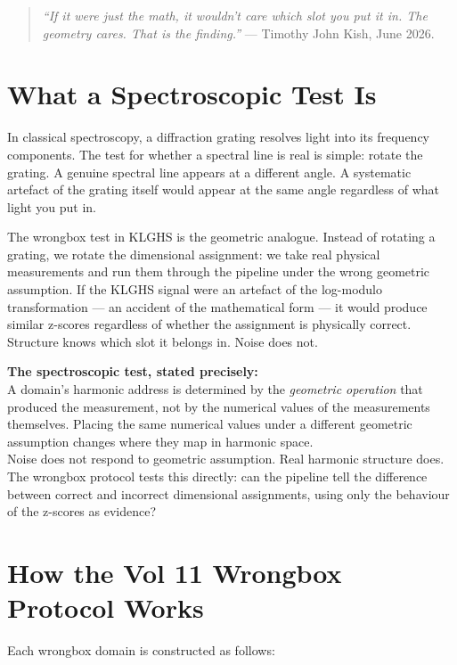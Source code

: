 \documentclass[11pt, letterpaper, openany]{book}
\begin{document}
\begin{quote}
\textit{``If it were just the math, it wouldn't care which slot you put it in.
The geometry cares. That is the finding.''} --- Timothy John Kish, June 2026.
\end{quote}

\section{What a Spectroscopic Test Is}

In classical spectroscopy, a diffraction grating resolves light into its
frequency components. The test for whether a spectral line is real is simple:
rotate the grating. A genuine spectral line appears at a different angle.
A systematic artefact of the grating itself would appear at the same angle
regardless of what light you put in.

The wrongbox test in KLGHS is the geometric analogue. Instead of rotating
a grating, we rotate the dimensional assignment: we take real physical
measurements and run them through the pipeline under the wrong geometric
assumption. If the KLGHS signal were an artefact of the log-modulo
transformation --- an accident of the mathematical form --- it would produce
similar z-scores regardless of whether the assignment is physically correct.
Structure knows which slot it belongs in. Noise does not.

\begin{spectrobox}
\textbf{The spectroscopic test, stated precisely:}\\[0.5em]
A domain's harmonic address is determined by the \textit{geometric operation}
that produced the measurement, not by the numerical values of the measurements
themselves. Placing the same numerical values under a different geometric
assumption changes where they map in harmonic space.\\[0.5em]
Noise does not respond to geometric assumption. Real harmonic structure does.
The wrongbox protocol tests this directly: can the pipeline tell the difference
between correct and incorrect dimensional assignments, using only the behaviour
of the z-scores as evidence?
\end{spectrobox}

\section{How the Vol 11 Wrongbox Protocol Works}

Each wrongbox domain is constructed as follows:
\end{document}

